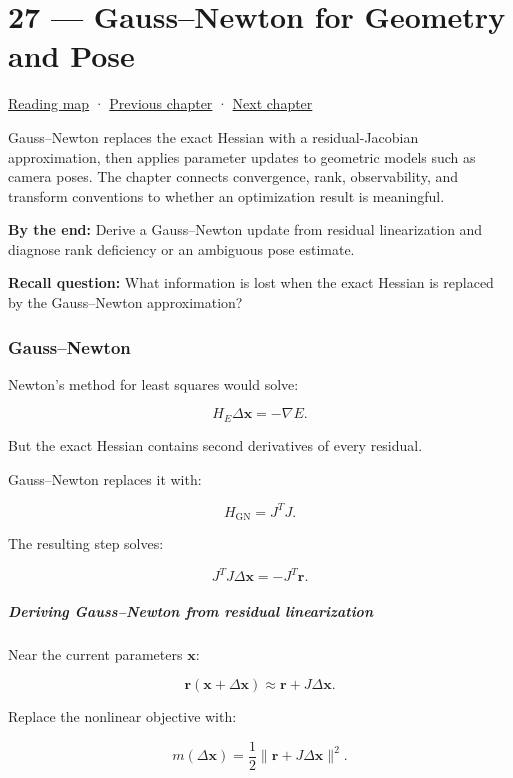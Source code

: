 \hypertarget{02-foundations-ii-ch027}{}
\section{27 --- Gauss--Newton for Geometry and Pose}\label{gaussnewton-for-geometry-and-pose}

\href{Chapter\%20Edition/01\%20-\%20Computing\%20Foundations/00\%20-\%20Reading\%20Map}{Reading map} · \hyperref[02-foundations-ii-ch026]{Previous chapter} · \hyperref[02-foundations-ii-ch028]{Next chapter}

Gauss--Newton replaces the exact Hessian with a residual-Jacobian approximation, then applies parameter updates to geometric models such as camera poses. The chapter connects convergence, rank, observability, and transform conventions to whether an optimization result is meaningful.

\textbf{By the end:} Derive a Gauss--Newton update from residual linearization and diagnose rank deficiency or an ambiguous pose estimate.

\textbf{Recall question:} What information is lost when the exact Hessian is replaced by the Gauss--Newton approximation?

\subsubsection{Gauss--Newton}\label{gaussnewton}

Newton's method for least squares would solve:

\[
H_E\Delta\mathbf x=-\nabla E.
\]

But the exact Hessian contains second derivatives of every residual.

Gauss--Newton replaces it with:

\[
H_{\mathrm{GN}}=J^TJ.
\]

The resulting step solves:

\[
\boxed{ J^TJ\Delta\mathbf x=-J^T\mathbf r }.
\]

\subparagraph{Deriving Gauss--Newton from residual linearization}\label{deriving-gaussnewton-from-residual-linearization}

Near the current parameters \(\mathbf x\):

\[
\mathbf r(\mathbf x+\Delta\mathbf x) \approx \mathbf r+J\Delta\mathbf x.
\]

Replace the nonlinear objective with:

\[
m(\Delta\mathbf x) = \frac12\|\mathbf r+J\Delta\mathbf x\|^2.
\]

